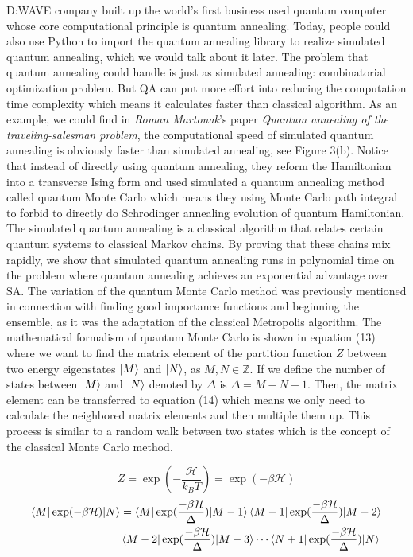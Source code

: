 \documentclass{turabian-researchpaper}
\begin{document}
    D:WAVE company built up the world's first business used quantum computer whose core computational principle is quantum annealing. Today, people could also use Python to import the quantum annealing library to realize simulated quantum annealing, which we would talk about it later. The problem that quantum annealing could handle is just as simulated annealing: combinatorial optimization problem. But QA can put more effort into reducing the computation time complexity which means it calculates faster than classical algorithm\cite{crosson2016simulated}. As an example, we could find in \textit{Roman Martonak}'s paper \textit{Quantum annealing of the traveling-salesman problem}\cite{martovnak2004quantum}, the computational speed of simulated quantum annealing is obviously faster than simulated annealing, see Figure 3(b)\cite{martovnak2004quantum}. Notice that instead of directly using quantum annealing, they reform the Hamiltonian into a transverse Ising form\cite{elliott1970ising} and used simulated a quantum annealing method called quantum Monte Carlo which means they using Monte Carlo path integral to forbid to directly do Schrodinger annealing evolution of quantum Hamiltonian. The simulated quantum annealing is a classical algorithm that relates certain quantum systems to classical Markov chains\cite{crosson2016simulated}. By proving that these chains mix rapidly, we show that simulated quantum annealing runs in polynomial time on the problem where quantum annealing achieves an exponential advantage over SA\cite{crosson2016simulated}. The variation of the quantum Monte Carlo method was previously mentioned in connection with finding good importance functions and beginning the ensemble, as it was the adaptation of the classical Metropolis algorithm\cite{ceperley1986quantum}. The mathematical formalism of quantum Monte Carlo is shown in equation (13) where we want to find the matrix element of the partition function $Z$ between two energy eigenstates $\ket{M}$ and $\ket{N}$, as $M,N\in \mathbb{Z}$. If we define the number of states between $\ket{M}$ and $\ket{N}$ denoted by $\Delta$ is $\Delta = M-N+1$. Then, the matrix element can be transferred to equation (14) which means we only need to calculate the neighbored matrix elements and then multiple them up. This process is similar to a random walk between two states which is the concept of the classical Monte Carlo method. 
    
    \begin{equation}
        Z = \exp(-\frac{\mathcal{H} }{k_B T}) = \exp(-\beta \mathcal{H})
    \end{equation}
    \begin{equation}
        \begin{aligned}
            \braket{M|\exp(-\beta \mathcal{H} )|N} &= \braket{M|\exp(\frac{-\beta \mathcal{H}}{\Delta})|M-1}\braket{M-1|\exp(\frac{-\beta \mathcal{H}}{\Delta})|M-2} \\
            &\braket{M-2|\exp(\frac{-\beta \mathcal{H}}{\Delta})|M-3}\cdots\braket{N+1|\exp(\frac{-\beta \mathcal{H}}{\Delta})|N}\\
        \end{aligned}
    \end{equation}
\end{document}

